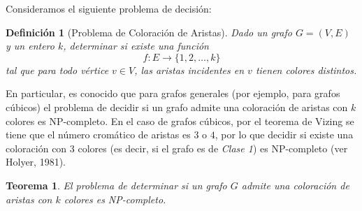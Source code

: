 \documentclass[a4paper]{article}
\newtheorem{theorem}{Teorema}
\newtheorem{definition}{Definición}
\begin{document}
Consideramos el siguiente problema de decisión:

\begin{definition}[Problema de Coloración de Aristas]
Dado un grafo $G=(V,E)$ y un entero $k$, determinar si existe una función
\[
f : E \to \{1,2,\dots,k\}
\]
tal que para todo vértice $v\in V$, las aristas incidentes en $v$ tienen colores distintos.
\end{definition}

En particular, es conocido que para grafos generales (por ejemplo, para grafos cúbicos) el problema de decidir si un grafo admite una coloración de aristas con $k$ colores es NP-completo. En el caso de grafos cúbicos, por el teorema de Vizing se tiene que el número cromático de aristas es $3$ o $4$, por lo que decidir si existe una coloración con $3$ colores (es decir, si el grafo es de \emph{Clase 1}) es NP-completo (ver Holyer, 1981).

\begin{theorem}
El problema de determinar si un grafo $G$ admite una coloración de aristas con $k$ colores es NP-completo.
\end{theorem}
\end{document}
